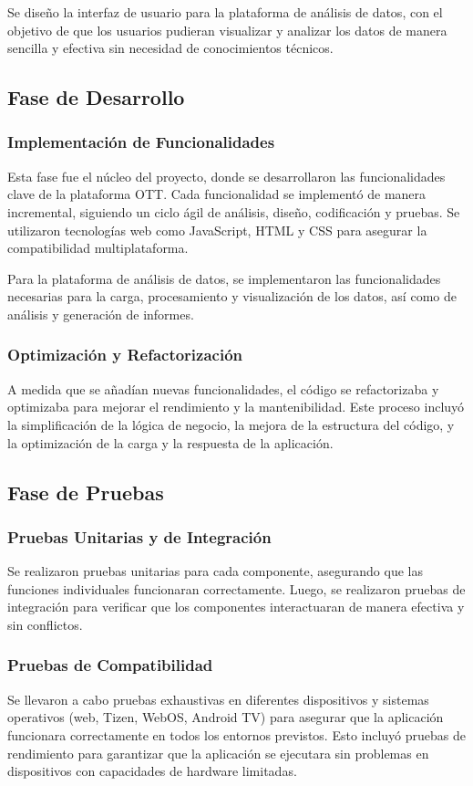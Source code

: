 Se diseño la interfaz de usuario para la plataforma de análisis de datos, con el objetivo de que los usuarios
pudieran visualizar y analizar los datos de manera sencilla y efectiva sin necesidad de conocimientos técnicos.

\subsection{Fase de Desarrollo}
\subsubsection{Implementación de Funcionalidades}
Esta fase fue el núcleo del proyecto, donde se desarrollaron las funcionalidades clave de la 
plataforma OTT. Cada funcionalidad se implementó de manera incremental, siguiendo un ciclo 
ágil de análisis, diseño, codificación y pruebas. Se utilizaron tecnologías web como JavaScript, 
HTML y CSS para asegurar la compatibilidad multiplataforma.

Para la plataforma de análisis de datos, se implementaron las funcionalidades necesarias para
la carga, procesamiento y visualización de los datos, así como de análisis y generación de informes.

\subsubsection{Optimización y Refactorización}
A medida que se añadían nuevas funcionalidades, el código se refactorizaba y optimizaba para 
mejorar el rendimiento y la mantenibilidad. Este proceso incluyó la simplificación de la lógica 
de negocio, la mejora de la estructura del código, y la optimización de la carga y la respuesta de la aplicación.

\subsection{Fase de Pruebas}
\subsubsection{Pruebas Unitarias y de Integración}
Se realizaron pruebas unitarias para cada componente, asegurando que las funciones individuales 
funcionaran correctamente. Luego, se realizaron pruebas de integración para verificar que los 
componentes interactuaran de manera efectiva y sin conflictos.

\subsubsection{Pruebas de Compatibilidad}
Se llevaron a cabo pruebas exhaustivas en diferentes dispositivos y sistemas operativos 
(web, Tizen, WebOS, Android TV) para asegurar que la aplicación funcionara correctamente 
en todos los entornos previstos. Esto incluyó pruebas de rendimiento para garantizar que 
la aplicación se ejecutara sin problemas en dispositivos con capacidades de hardware limitadas.


